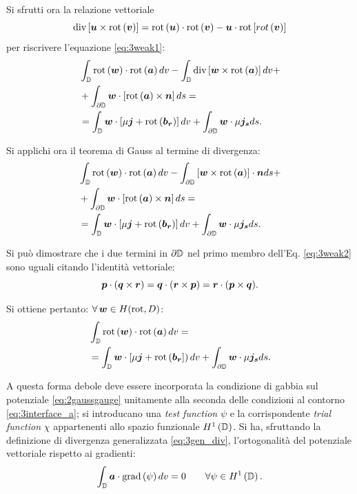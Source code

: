 Si sfrutti ora la relazione vettoriale
\begin{equation}
\text{div}\left[\boldsymbol{u}\times \text{rot}\left(\boldsymbol{v}\right)\right] = \text{rot}\left(\boldsymbol{u}\right)\cdot \text{rot}\left(\boldsymbol{v}\right)-\boldsymbol{u}\cdot \text{rot}\left[rot\left(\boldsymbol{v}\right)\right]
\label{eq:3vectrel}
\end{equation}
per riscrivere l'equazione \eqref{eq:3weak1}:
\begin{align}
\label{eq:3weak2}
&\int_{\mathbb{D}}\text{rot}\left(\boldsymbol{w}\right)\cdot \text{rot}\left(\boldsymbol{a}\right) dv-\int_{\mathbb{D}} \text{div}\left[\boldsymbol{w}\times \text{rot}\left(\boldsymbol{a}\right)\right] dv + \nonumber\\
&+\int_{\partial\mathbb{D}}\boldsymbol{w}\cdot \left[\text{rot}\left(\boldsymbol{a}\right)\times\boldsymbol{n}\right]ds= \nonumber\\
&=\int_{\mathbb{D}}\boldsymbol{w}\cdot\left[\mu\boldsymbol{j}+\text{rot}\left(\boldsymbol{b_r}\right)\right]dv+\int_{\partial\mathbb{D}}\boldsymbol{w}\cdot \mu\boldsymbol{j_s} ds.
\end{align}

Si applichi ora il teorema di Gauss al termine di divergenza:
\begin{align}
\label{eq:3weak3}
&\int_{\mathbb{D}}\text{rot}\left(\boldsymbol{w}\right)\cdot \text{rot}\left(\boldsymbol{a}\right) dv-\int_{\partial\mathbb{D}} \left[\boldsymbol{w}\times \text{rot}\left(\boldsymbol{a}\right)\right]\cdot \boldsymbol{n} ds + \nonumber\\
&+\int_{\partial\mathbb{D}}\boldsymbol{w}\cdot \left[\text{rot}\left(\boldsymbol{a}\right)\times\boldsymbol{n}\right]ds= \nonumber\\
&=\int_{\mathbb{D}}\boldsymbol{w}\cdot\left[\mu\boldsymbol{j}+\text{rot}\left(\boldsymbol{b_r}\right)\right]dv+\int_{\partial\mathbb{D}}\boldsymbol{w}\cdot \mu\boldsymbol{j_s} ds.
\end{align}

Si può dimostrare che i due termini in $\partial\mathbb{D}$ nel primo membro dell'Eq. \eqref{eq:3weak2} sono uguali citando l'identità vettoriale:
\begin{equation}
\label{eq:3vectidentity}
\boldsymbol{p} \cdot (\boldsymbol{q} \times \boldsymbol{r}) = \boldsymbol{q} \cdot (\boldsymbol{r} \times \boldsymbol{p}) = \boldsymbol{r} \cdot (\boldsymbol{p} \times \boldsymbol{q}).
\end{equation}

Si ottiene pertanto:
$\forall \,\boldsymbol{w} \in H(\text{rot},D)$:
\begin{align}
\label{eq:3weak4}
&\int_{\mathbb{D}}\text{rot}\left(\boldsymbol{w}\right)\cdot \text{rot}\left(\boldsymbol{a}\right) dv
= \nonumber\\
&=\int_{\mathbb{D}}\boldsymbol{w}\cdot\left[\mu\boldsymbol{j}+\text{rot}\left(\boldsymbol{b_r}\right]\right)dv+\int_{\partial\mathbb{D}}\boldsymbol{w}\cdot \mu\boldsymbol{j_s} ds.
\end{align}

A questa forma debole deve essere incorporata la condizione di gabbia sul potenziale \eqref{eq:2gaussgauge} unitamente alla seconda delle condizioni al contorno \eqref{eq:3interface_a}; si introducano una \textit{test function}  $\psi$ e la corrispondente \textit{trial function} $\chi$ appartenenti allo spazio funzionale $H^1\left(\mathbb{D}\right)$. Si ha, sfruttando la definizione di divergenza generalizzata \eqref{eq:3gen_div}, l'ortogonalità del potenziale vettoriale rispetto ai gradienti:
\begin{equation}
\label{eq:3weakgauge}
\int_{\mathbb{D}} \boldsymbol{a} \cdot \text{grad}\left(\psi\right) dv = 0 \qquad \forall \psi \in H^1\left(\mathbb{D}\right).
\end{equation}

